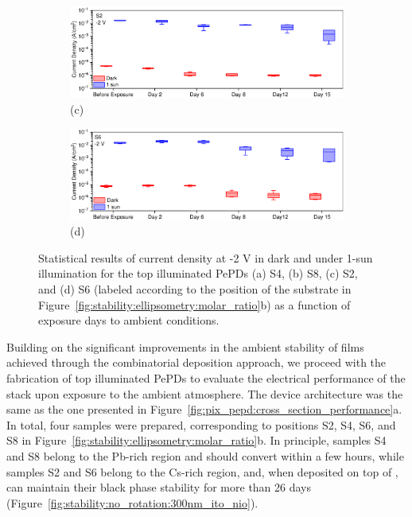 \begin{figure}[ht!]
    \begin{subfigure}[t]{0.99\textwidth}
        \centering
        \includegraphics[width=\textwidth]{chapters/stability/imeges/AP44_2_Thesis.pdf} %
        \caption*{(c)}
    \end{subfigure}
    \hfill
    \begin{subfigure}[t]{0.99\textwidth}
        \centering
        \includegraphics[width=\textwidth]{chapters/stability/imeges/AP44_4_Thesis.pdf} %
        \caption*{(d)}
    \end{subfigure}
    \caption[Statistical results of current density at -2 V in dark and under 1-sun illumination for the top illuminated PePDs as a function of exposure days to ambient conditions.]{Statistical results of current density at -2 V in dark and under 1-sun illumination for the top illuminated PePDs (a) S4, (b) S8, (c) S2, and (d) S6 (labeled according to the position of the substrate in Figure~\ref{fig:stability:ellipsometry:molar_ratio}b) as a function of exposure days to ambient conditions.}
    \label{fig:stability:pepd_stability}
\end{figure}


Building on the significant improvements in the ambient stability of  films achieved through the combinatorial deposition approach, we proceed with the fabrication of top illuminated PePDs to evaluate the electrical performance of the stack upon exposure to the ambient atmosphere. The device architecture was the same as the one presented in Figure~\ref{fig:pix_pepd:cross_section_performance}a. In total, four samples were prepared, corresponding to positions S2, S4, S6, and S8 in Figure~\ref{fig:stability:ellipsometry:molar_ratio}b. In principle, samples S4 and S8 belong to the Pb-rich region and should convert within a few hours, while samples S2 and S6 belong to the Cs-rich region, and, when deposited on top of , can maintain their black phase stability for more than 26 days (Figure~\ref{fig:stability:no_rotation:300nm_ito_nio}). 

